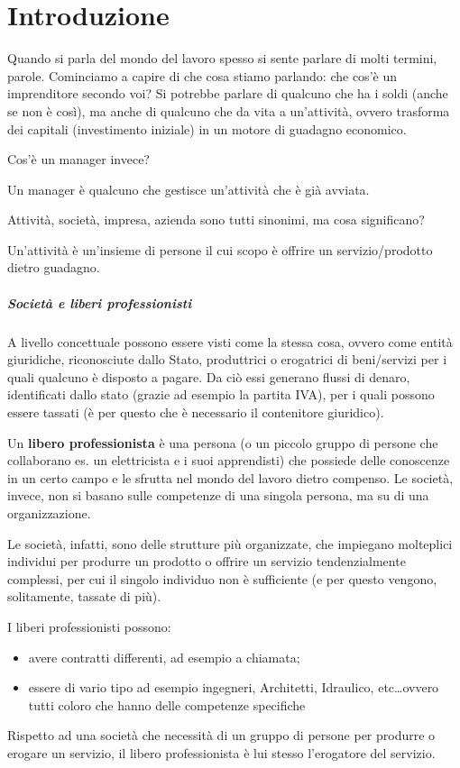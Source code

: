 \chapter{Introduzione}

Quando si parla del mondo del lavoro spesso si sente parlare di molti termini,
parole. Cominciamo a capire di che cosa stiamo parlando: che cos'è un
imprenditore secondo voi? Si potrebbe parlare di qualcuno che ha i soldi (anche
se non è così), ma anche di qualcuno che da vita a un'attività, ovvero
trasforma dei capitali (investimento iniziale) in un motore di guadagno
economico.

Cos'è un manager invece?
\begin{definition}[Manager]
Un manager è qualcuno che gestisce un'attività che è già avviata.
\end{definition}

Attività, società, impresa, azienda sono tutti sinonimi, ma cosa significano?
\begin{definition}[Attività]
Un'attività è un'insieme di persone il cui scopo è offrire un servizio/prodotto
dietro guadagno.
\end{definition}

\paragraph*{Società e liberi professionisti} A livello concettuale possono 
essere visti come la stessa cosa, ovvero come entità giuridiche, riconosciute 
dallo Stato, produttrici o erogatrici di beni/servizi per i quali qualcuno è 
disposto a pagare. Da ciò essi generano flussi di denaro, identificati dallo 
stato (grazie ad esempio la partita IVA), per i quali possono essere tassati (è 
per questo che è necessario il contenitore giuridico).

Un \textbf{libero professionista} è una persona (o un piccolo gruppo di persone 
che collaborano es. un elettricista e i suoi apprendisti) che possiede delle
conoscenze in un certo campo e le sfrutta nel mondo del lavoro dietro compenso.
Le società, invece, non si basano sulle competenze di una singola persona, ma su
di una organizzazione.

Le società, infatti, sono delle strutture più organizzate, che
impiegano molteplici individui per produrre un prodotto o offrire un servizio
tendenzialmente complessi, per cui il singolo individuo non è
sufficiente (e per questo vengono, solitamente, tassate di più).

I liberi professionisti possono:
\begin{itemize}
  \item avere contratti differenti, ad esempio a chiamata;
  \item essere di vario tipo ad esempio ingegneri, Architetti, Idraulico,
  etc\dots ovvero tutti coloro che hanno delle competenze specifiche
\end{itemize}
Rispetto ad una società che necessità di un gruppo di persone per produrre o
erogare un servizio, il libero professionista è lui stesso l'erogatore del
servizio.

